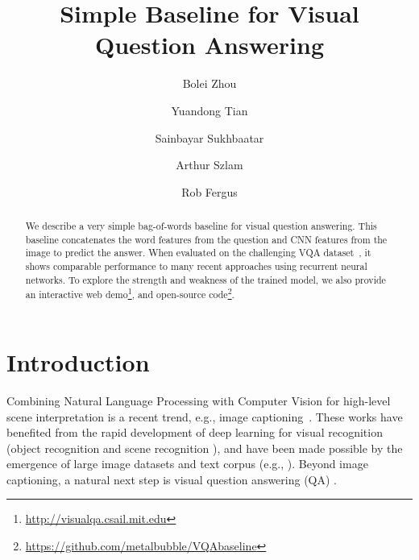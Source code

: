 \documentclass{article} %
\title{Simple Baseline for Visual Question Answering}
\author[1]{Bolei Zhou}
\author[2]{Yuandong Tian}
\author[2]{Sainbayar Sukhbaatar}
\author[2]{Arthur Szlam}
\author[2]{Rob Fergus}
\affil[1]{Massachusetts Institute of Technology}
\affil[2]{Facebook AI Research}
\begin{document}
\maketitle

\begin{abstract}
We describe a very simple bag-of-words baseline for visual question answering. This baseline concatenates the word features from the question and CNN features from the image to predict the answer. When evaluated on the challenging VQA dataset~\cite{antol2015vqa}, it shows comparable performance to many recent approaches using recurrent neural networks. To explore the strength and weakness of the trained model, we also provide an interactive web demo\footnote{\url{http://visualqa.csail.mit.edu}}, and open-source  code\footnote{\url{https://github.com/metalbubble/VQAbaseline}}.
\end{abstract}

\section{Introduction}
Combining Natural Language Processing with Computer Vision for high-level scene interpretation is a recent trend, e.g., image captioning~\cite{mao2014deep,vinyals2014show,kiros2014multimodal,devlin2015exploring}. These works have
benefited from the rapid development of deep learning for visual recognition (object recognition \cite{krizhevsky2012imagenet} and scene recognition \cite{zhou2014learning}), and have been made possible by the emergence of large image datasets and text corpus (e.g., \cite{lin2014microsoft}). Beyond image captioning, a natural next step is visual question answering (QA) \cite{ren2015exploring,antol2015vqa,gao2015you}. 


\end{document}
